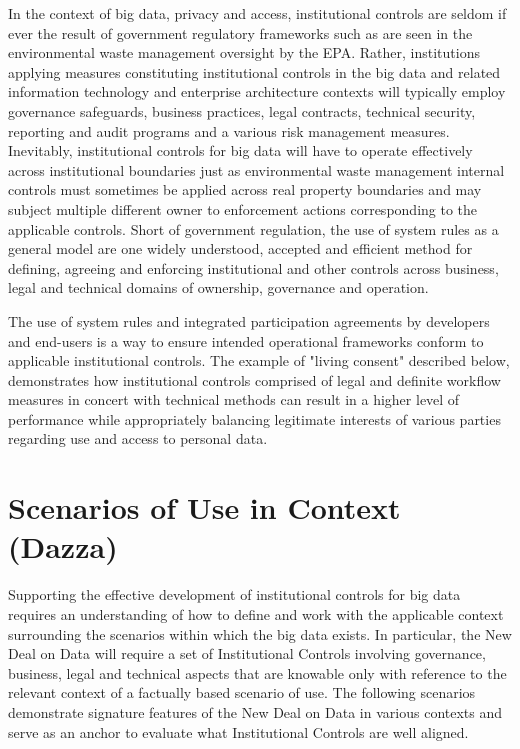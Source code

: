 In the context of big data, privacy and access, institutional controls are seldom if ever the result of government regulatory frameworks such as are seen in the environmental waste management oversight by the EPA.
Rather, institutions applying measures constituting institutional controls in the big data and related information technology and enterprise architecture contexts will typically employ governance safeguards, business practices, legal contracts, technical security, reporting and audit programs and a various risk management measures.
Inevitably, institutional controls for big data will have to operate effectively across institutional boundaries just as environmental waste management internal controls must sometimes be applied across real property boundaries and may subject multiple different owner to enforcement actions corresponding to the applicable controls.
Short of government regulation, the use of system rules as a general model are one widely understood, accepted and efficient method for defining, agreeing and enforcing institutional and other controls across business, legal and technical domains of ownership, governance and operation.

The use of system rules and integrated participation agreements by developers and end-users is a way to ensure intended operational frameworks conform to applicable institutional controls.
The example of "living consent" described below, demonstrates how institutional controls comprised of legal and definite workflow measures in concert with technical methods can result in a higher level of performance while appropriately balancing legitimate interests of various parties regarding use and access to personal data.

\section{Scenarios of Use in Context (Dazza)}

Supporting the effective development of institutional controls for big data requires an understanding of how to define and work with the applicable context surrounding the scenarios within which the big data exists. In particular, the New Deal on Data will require a set of Institutional Controls involving governance, business, legal and technical aspects that are knowable only with reference to the relevant context of a factually based scenario of use. The following scenarios demonstrate signature features of the New Deal on Data in various contexts and serve as an anchor to evaluate what Institutional Controls are well aligned.

